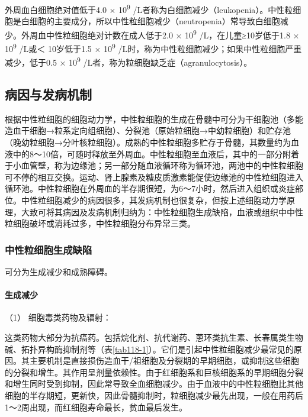 外周血白细胞绝对值低于4.0 × 10\textsuperscript{9}
/L者称为白细胞减少（leukopenia）。中性粒细胞是白细胞的主要成分，所以中性粒细胞减少（neutropenia）常导致白细胞减少。外周血中性粒细胞绝对计数在成人低于2.0
× 10\textsuperscript{9} /L，在儿童≥10岁低于1.8 × 10\textsuperscript{9}
/L或＜ 10岁低于1.5 × 10\textsuperscript{9}
/L时，称为中性粒细胞减少；如果中性粒细胞严重减少，低于0.5 ×
10\textsuperscript{9} /L者，称为粒细胞缺乏症（agranulocytosis）。

\subsection{病因与发病机制}

根据中性粒细胞的细胞动力学，中性粒细胞的生成在骨髓中可分为干细胞池（多能造血干细胞→粒系定向组细胞）、分裂池（原始粒细胞→中幼粒细胞）和贮存池（晚幼粒细胞→分叶核粒细胞）。成熟的中性粒细胞多贮存于骨髓，其数量约为血液中的8～10倍，可随时释放至外周血。中性粒细胞至血液后，其中的一部分附着于小血管壁，称为边缘池；另一部分随血液循环称为循环池，两池中的中性粒细胞可不停的相互交换。运动、肾上腺素及糖皮质激素能促使边缘池的中性粒细胞进入循环池。中性粒细胞在外周血的半存期很短，为6～7小时，然后进入组织或炎症部位。中性粒细胞减少的病因很多，其发病机制也很复杂，但按上述细胞动力学原理，大致可将其病因及发病机制归纳为：中性粒细胞生成缺陷，血液或组织中中性粒细胞破坏或消耗过多，中性粒细胞分布异常三类。

\subsubsection{中性粒细胞生成缺陷}

可分为生成减少和成熟障碍。

\paragraph{生成减少}

\hypertarget{text00336.htmlux5cux23CHP12-2-1-1-1-1}{}
（1） 细胞毒类药物及辐射：

这类药物大部分为抗癌药。包括烷化剂、抗代谢药、蒽环类抗生素、长春属类生物碱、拓扑异构酶抑制剂等（表\ref{tab118-1}）。它们是引起中性粒细胞减少最常见的原因。其主要机制是直接损伤造血干/祖细胞及分裂期的早期细胞，或抑制这些细胞的分裂和增生。其作用呈剂量依赖性。由于红细胞系和巨核细胞系的早期细胞分裂和增生同时受到抑制，因此常导致全血细胞减少。由于血液中的中性粒细胞比其他细胞的半存期短，更新快，因此骨髓抑制时，粒细胞减少最先出现，一般在用药后1～2周出现，而红细胞寿命最长，贫血最后发生。

